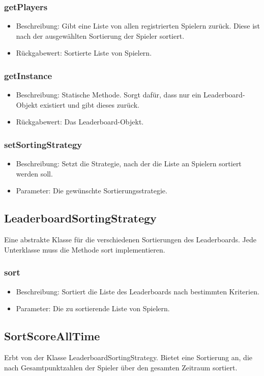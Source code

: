\documentclass[a4paper]{scrreprt}
\begin{document}
	\subsubsection{getPlayers}
	\begin{itemize}
		\item Beschreibung: Gibt eine Liste von allen registrierten Spielern zurück. Diese ist nach der ausgewählten Sortierung der Spieler sortiert.
		\item Rückgabewert: Sortierte Liste von Spielern.
	\end{itemize}
	\subsubsection{getInstance}
	\begin{itemize}
		\item Beschreibung: Statische Methode. Sorgt dafür, dass nur ein Leaderboard-Objekt existiert und gibt dieses zurück.
		\item Rückgabewert: Das Leaderboard-Objekt.
	\end{itemize}
	\subsubsection{setSortingStrategy}
	\begin{itemize}
		\item Beschreibung: Setzt die Strategie, nach der die Liste an Spielern sortiert werden soll.
		\item Parameter: Die gewünschte Sortierungsstrategie.
	\end{itemize}

	\subsection{LeaderboardSortingStrategy}
	Eine abstrakte Klasse für die verschiedenen Sortierungen des Leaderboards. Jede Unterklasse muss die Methode sort implementieren.
	\subsubsection{sort}
	\begin{itemize}
		\item Beschreibung: Sortiert die Liste des Leaderboards nach bestimmten Kriterien.
		\item Parameter: Die zu sortierende Liste von Spielern.
	\end{itemize}

	\subsection{SortScoreAllTime}
	Erbt von der Klasse LeaderboardSortingStrategy. Bietet eine Sortierung an, die nach Gesamtpunktzahlen der Spieler über den gesamten Zeitraum sortiert.
\end{document}
